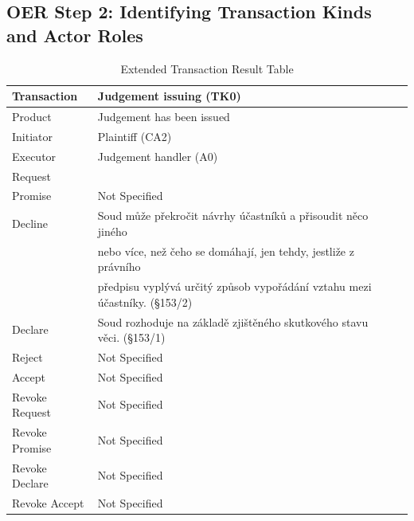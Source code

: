\begin{landscape}
\section{OER Step 2: Identifying Transaction Kinds and Actor Roles}

\begin{table}[h]
\caption{Extended Transaction Result Table}
\label{tab:etrt}
\begin{tabular}{|l||l|l|}
\hline
Transaction  & Judgement issuing (TK0) \\ \hline
Product      & Judgement has been issued   \\ \hline
Initiator      & Plaintiff (CA2) \\ \hline
Executor       & Judgement handler (A0) \\ \hline
Request        &  \\ \hline
Promise        & Not Specified   \\ \hline
Decline        &  Soud může překročit návrhy účastníků a přisoudit něco jiného \\  &  nebo více, než čeho se
domáhají, jen tehdy, jestliže z právního \\ & předpisu vyplývá určitý způsob vypořádání vztahu mezi účastníky. (\S153/2) \\ \hline
Declare        &  Soud rozhoduje na základě zjištěného skutkového stavu věci. (\S153/1)\\ \hline
Reject         & Not Specified   \\ \hline
Accept         & Not Specified \\ \hline
Revoke Request & Not Specified \\ \hline
Revoke Promise & Not Specified \\ \hline
Revoke Declare & Not Specified  \\ \hline
Revoke Accept  &  Not Specified   \\ \hline
\end{tabular}
\end{table}


\end{landscape}
